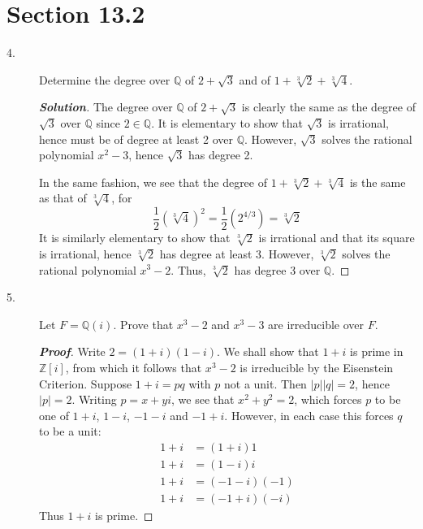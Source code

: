\documentclass[12pt,leqno]{book}
\theoremstyle{definition}
\newcommand{\Z}{\mathbb{Z}}
\newcommand{\Q}{\mathbb{Q}}
\newenvironment{Proof}{\begin{proof}[\textnormal{\textbf{Proof}}]}{\end{proof}}
\newenvironment{Solution}{\begin{proof}[\textnormal{\textbf{Solution}}]}{\end{proof}}
\begin{document}
\section*{Section 13.2}
\begin{description}
 \item [4.] Determine the degree over $\Q$ of $2+\sqrt{3}$ and of $1+\sqrt[3]{2}+\sqrt[3]{4}$. 
  \begin{Solution}
   The degree over $\Q$ of $2+\sqrt{3}$ is clearly the same as the degree of $\sqrt{3}$ over $\Q$ since $2\in\Q$. It is elementary to show that $\sqrt{3}$ is irrational, hence must be of degree at least 2 over $\Q$. However, $\sqrt{3}$ solves the rational polynomial $x^2-3$, hence $\sqrt{3}$ has degree 2.

  In the same fashion, we see that the degree of $1+\sqrt[3]{2}+\sqrt[3]{4}$ is the same as that of $\sqrt[3]{4}$, for \[\frac{1}{2}\left(\sqrt[3]{4}\right)^2=\frac{1}{2}\left(2^{4/3}\right)=\sqrt[3]{2}\] It is similarly elementary to show that $\sqrt[3]{2}$ is irrational and that its square is irrational, hence $\sqrt[3]{2}$ has degree at least 3. However, $\sqrt[3]{2}$ solves the rational polynomial $x^3-2$. Thus, $\sqrt[3]{2}$ has degree 3 over $\Q$. 
  \end{Solution}
 \item [5.] Let $F=\Q(i)$. Prove that $x^3-2$ and $x^3-3$ are irreducible over $F$.
  \begin{Proof}
   Write $2=(1+i)(1-i)$. We shall show that $1+i$ is prime in $\Z[i]$, from which it follows that $x^3-2$ is irreducible by the Eisenstein Criterion. Suppose $1+i=pq$ with $p$ not a unit. Then $|p||q|=2$, hence $|p|=2$. Writing $p=x+yi$, we see that $x^2+y^2=2$, which forces $p$ to be one of $1+i$, $1-i$, $-1-i$ and $-1+i$. However, in each case this forces $q$ to be a unit: \begin{align*}1+i&=(1+i)1\\1+i&=(1-i)i\\1+i&=(-1-i)(-1)\\1+i&=(-1+i)(-i)\end{align*} Thus $1+i$ is prime.


\end{Proof}
\end{description}
\end{document}
